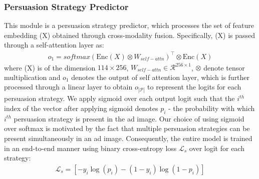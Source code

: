 \documentclass[hidelinks,11pt,a4paper]{report}
\begin{document}


\subsubsection{Persuasion Strategy Predictor} 
This module is a persuasion strategy predictor, which processes the set of feature embedding (X) obtained through cross-modality fusion. Specifically, (X) is passed through a self-attention layer as:
\begin{align}
o_{1} = softmax(\text{Enc}(X) \otimes W_{self-attn})^\intercal \otimes \text{Enc}(X)
\end{align}
where (X) is of the dimension $114\times256$,  $W_{self-attn} \in \mathcal{R}^{256 \times 1}$, $\otimes$ denote tensor multiplication and $o_1$ denotes the output of self attention layer, which is further processed through a linear layer to obtain $o_{|\mathcal{P}|}$ to represent the logits for each persuasion strategy. We apply sigmoid over each output logit such that the $i^{th}$ index of the vector after applying sigmoid denotes $p_i$ - the probability with which $i^{th}$ persuasion strategy is present in the ad image. Our choice of using sigmoid over softmax is motivated by the fact that multiple persuasion strategies can be present simultaneously in an ad image. Consequently, the entire model is trained in an end-to-end manner using binary cross-entropy loss $\mathcal{L}_{s}$ over logit for each strategy:
\begin{align}
        \mathcal{L}_{s} = \left[-y_i \log(p_i) - (1-y_i) \log(1 - p_i) \right]
\end{align}
\end{document}
